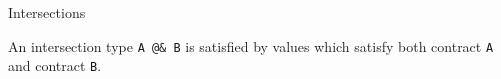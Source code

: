 \documentclass[sigplan,screen,10pt]{acmart}
\newcommand{\resolved}[2]{}
\newcommand{\nickel}[1]{\lstinline[language=nickel]{#1}}
\begin{document}
%




\resolved{Arnaud: this paragraph is pretty good, on the other hand, there
is no value which lets me complete the example, so this example falls
a bit flat.
Teo: Improved the example, also added another one commented that is, for me,
more realistic, but I think the one uncommented is simpler.}



\subsection{Intersections}

An intersection type \nickel{A @& B} is satisfied by values which
satisfy both contract \nickel{A} and contract \nickel{B}.
\end{document}
